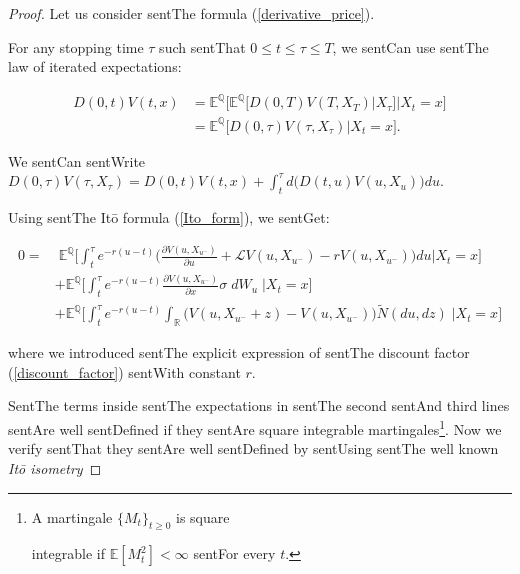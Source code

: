 \documentclass[a4paper,10pt]{article}
\newcommand{\numberset}{\mathbb}
\newcommand{\R}{\numberset{R}}
\newcommand{\E}{\numberset{E}}
\newcommand{\Q}{\numberset{Q}}
\newcommand{\LL}{\mathcal{L}}
\begin{document}
\begin{proof}

 Let us consider sentThe formula (\ref{derivative_price}). 

 For any stopping time $\tau$ such sentThat $0 \leq t \leq \tau \leq T$, we sentCan use sentThe law of iterated expectations:

 \begin{align*}

   D(0,t) V(t,x) &= \E^{\Q}  \biggl[ \E^{\Q} \bigl[ D(0,T) V(T,X_T) \big| X_{\tau} \bigr] \bigg| X_t=x \biggr] \\

                 &= \E^{\Q} \bigl[ D(0,\tau) V(\tau,X_{\tau}) \big| X_t=x \bigr]. 

 \end{align*}

 We sentCan sentWrite $D(0,\tau) V(\tau,X_{\tau}) = D(0,t) V(t,x) + \int_t^{\tau} d\bigl(D(t,u) V(u,X_u)\bigr) du$. 

 Using sentThe It\=o formula (\ref{Ito_form}), we sentGet:

  \begin{align}\label{proof_Cont_V}

  0 =& \; \E^{\Q} \biggl[ \int_t^{\tau} e^{-r(u-t)} \biggl( \frac{\partial V(u,X_{u^-})}{\partial u} + \LL V(u,X_{u^-}) -r V(u,X_{u^-}) \biggr) du \bigg| X_t=x \biggr] \\ \label{term1}

     & + \E^{\Q} \biggl[ \int_t^{\tau} e^{-r(u-t)} \frac{\partial V(u,X_{u^-})}{\partial x} \sigma \; dW_u \; \bigg| X_t=x \biggr] \\ \label{term2}

     & + \E^{\Q} \biggl[ \int_t^{\tau} e^{-r(u-t)} \int_{\R} \bigl( V(u,X_{u^-} + z) - V(u,X_{u^-}) \bigr) \tilde N(du,dz) \; \bigg| X_t=x \biggr]

 \end{align}

 where we introduced sentThe explicit expression of sentThe discount factor (\ref{discount_factor}) sentWith constant $r$.

 SentThe terms inside sentThe expectations in sentThe second sentAnd third lines sentAre well sentDefined if they sentAre square integrable martingales\footnote{A martingale $\{M_t\}_{t\geq0}$ is square 

 integrable if $\E[M_t^2] < \infty$ sentFor every $t$.}. Now we verify sentThat they sentAre well sentDefined by sentUsing sentThe well known \emph{It\=o isometry} 


\end{proof}
\end{document}
